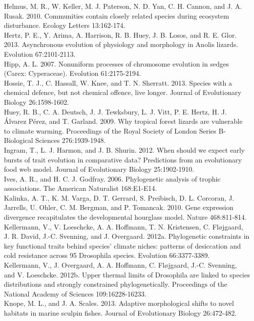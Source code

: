 Helmus, M. R., W. Keller, M. J. Paterson, N. D. Yan, C. H. Cannon, and J. A. Rusak. 2010. Communities contain closely related species during ecosystem disturbance. Ecology Letters 13:162-174.\\
Hertz, P. E., Y. Arima, A. Harrison, R. B. Huey, J. B. Losos, and R. E. Glor. 2013. Asynchronous evolution of physiology and morphology in Anolis lizards. Evolution 67:2101-2113.\\
Hipp, A. L. 2007. Nonuniform processes of chromosome evolution in sedges (Carex: Cyperaceae). Evolution 61:2175-2194.\\
Hossie, T. J., C. Hassall, W. Knee, and T. N. Sherratt. 2013. Species with a chemical defence, but not chemical offence, live longer. Journal of Evolutionary Biology 26:1598-1602.\\
Huey, R. B., C. A. Deutsch, J. J. Tewksbury, L. J. Vitt, P. E. Hertz, H. J. \'{A}lvarez P\'{e}rez, and T. Garland. 2009. Why tropical forest lizards are vulnerable to climate warming. Proceedings of the Royal Society of London Series B-Biological Sciences 276:1939-1948.\\
Ingram, T., L. J. Harmon, and J. B. Shurin. 2012. When should we expect early bursts of trait evolution in comparative data? Predictions from an evolutionary food web model. Journal of Evolutionary Biology 25:1902-1910.\\
Ives, A. R., and H. C. J. Godfray. 2006. Phylogenetic analysis of trophic associations. The American Naturalist 168:E1-E14.\\
Kalinka, A. T., K. M. Varga, D. T. Gerrard, S. Preibisch, D. L. Corcoran, J. Jarrells, U. Ohler, C. M. Bergman, and P. Tomancak. 2010. Gene expression divergence recapitulates the developmental hourglass model. Nature 468:811-814.\\
Kellermann, V., V. Loeschcke, A. A. Hoffmann, T. N. Kristensen, C. Fløjgaard, J. R. David, J.-C. Svenning, and J. Overgaard. 2012a. Phylogenetic constraints in key functional traits behind species' climate niches: patterns of desiccation and cold resistance across 95 Drosophila species. Evolution 66:3377-3389.\\
Kellermann, V., J. Overgaard, A. A. Hoffmann, C. Fløjgaard, J.-C. Svenning, and V. Loeschcke. 2012b. Upper thermal limits of Drosophila are linked to species distributions and strongly constrained phylogenetically. Proceedings of the National Academy of Sciences 109:16228-16233.\\
Knope, M. L., and J. A. Scales. 2013. Adaptive morphological shifts to novel habitats in marine sculpin fishes. Journal of Evolutionary Biology 26:472-482.\\
